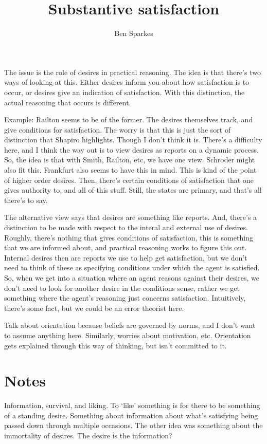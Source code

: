 \documentclass[10pt]{article}
\title{Substantive satisfaction}
\author{Ben Sparkes}
\begin{document}
\maketitle

The issue is the role of desires in practical reasoning.
The idea is that there's two ways of looking at this.
Either desires inform you about how satisfaction is to occur, or desires give an indication of satisfaction.
With this distinction, the actual reasoning that occurs is different.


Example: Railton seems to be of the former.
The desires themselves track, and give conditions for satisfaction.
The worry is that this is just the sort of distinction that Shapiro highlights.
Though I don't think it is.
There's a difficulty here, and I think the way out is to view desires as reports on a dynamic process.
So, the idea is that with Smith, Railton, etc, we have one view.
Schroder might also fit this.
Frankfurt also seems to have this in mind.
This is kind of the point of higher order desires.
Then, there's certain conditions of satisfaction that one gives authority to, and all of this stuff.
Still, the states are primary, and that's all there's to say.

The alternative view says that desires are something like reports.
And, there's a distinction to be made with respect to the interal and external use of desires.
Roughly, there's nothing that gives conditions of satisfaction, this is something that we are informed about, and practical reasoning works to figure this out.
Internal desires then are reports we use to help get satisfaction, but we don't need to think of these as specifying conditions under which the agent is satisfied.
So, when we get into a situation where an agent reasons against their desires, we don't need to look for another desire in the conditions sense, rather we get something where the agent's reasoning just concerns satisfaction.
Intuitively, there's some fact, but we could be an error theorist here.

Talk about orientation because beliefs are governed by norms, and I don't want to assume anything here.
Similarly, worries about motivation, etc.
Orientation gets explained through this way of thinking, but isn't committed to it.


\section{Notes}
\label{sec:notes}

Information, survival, and liking.
To `like' something is for there to be something of a standing desire.
Something about information about what's satisfying being passed down through multiple occasions.
The other idea was something about the immortality of desires.
The desire is the information?
\end{document}
